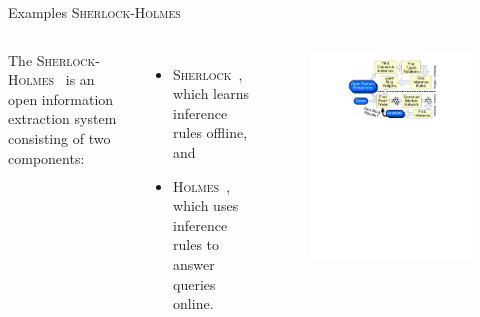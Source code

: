 \documentclass[onlymath,xcolor=pdftex,dvipsnames,table]{beamer}
\newcommand{\sherlock}{\textsc{Sherlock}\xspace}
\newcommand{\holmes}{\textsc{Holmes}\xspace}
\newcommand{\head}[1]{{\large\color{OliveGreen}#1\\[5pt]}}
\begin{document}
\begin{frame}{Examples}
\head{\sherlock-\holmes}
\begin{columns}[c]
  The \sherlock-\holmes~\cite{schoenmackers2011inference} is an open information extraction system consisting of two components:
  \begin{itemize}
    \item \sherlock~\cite{schoenmackers2010learning}, which learns inference rules offline, and
    \item \holmes~\cite{schoenmackers2008scaling}, which uses inference rules to answer queries online.
  \end{itemize}

  \begin{figure}
    \centering
    \includegraphics[clip,trim=125pt 500pt 125pt 30pt,width=\linewidth]{sherlock.pdf}
  \end{figure}
\end{columns}
\end{frame}
\end{document}
